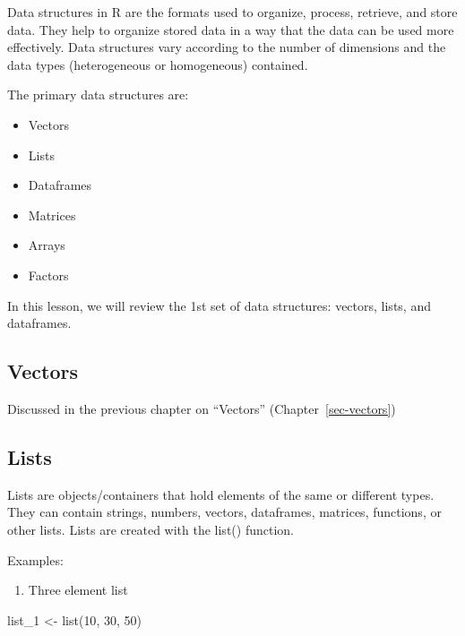 \documentclass[
  letterpaper,
  DIV=11,
  numbers=noendperiod]{scrreprt}
\newenvironment{Shaded}{}{}
\newcommand{\DecValTok}[1]{\textcolor[rgb]{0.00,0.36,0.77}{#1}}
\newcommand{\FunctionTok}[1]{\textcolor[rgb]{0.44,0.26,0.76}{#1}}
\newcommand{\NormalTok}[1]{\textcolor[rgb]{0.14,0.16,0.18}{#1}}
\newcommand{\OtherTok}[1]{\textcolor[rgb]{0.44,0.26,0.76}{#1}}
\providecommand{\tightlist}{%
  \setlength{\itemsep}{0pt}\setlength{\parskip}{0pt}}\usepackage{longtable,booktabs,array}
\begin{document}
Data structures in R are the formats used to organize, process,
retrieve, and store data. They help to organize stored data in a way
that the data can be used more effectively. Data structures vary
according to the number of dimensions and the data types (heterogeneous
or homogeneous) contained.

The primary data structures are:

\begin{itemize}
\tightlist
\item
  Vectors
\item
  Lists
\item
  Dataframes
\item
  Matrices
\item
  Arrays
\item
  Factors
\end{itemize}

In this lesson, we will review the 1st set of data structures: vectors,
lists, and dataframes.

\subsection{Vectors}\label{vectors}

Discussed in the previous chapter on ``Vectors''
(Chapter~\ref{sec-vectors})

\subsection{Lists}\label{lists}

Lists are objects/containers that hold elements of the same or different
types. They can contain strings, numbers, vectors, dataframes, matrices,
functions, or other lists. Lists are created with the list() function.

Examples:

\begin{enumerate}
\def\labelenumi{\alph{enumi}.}
\tightlist
\item
  Three element list
\end{enumerate}

\begin{Shaded}
\begin{Highlighting}[]
\NormalTok{list\_1 }\OtherTok{\textless{}{-}} \FunctionTok{list}\NormalTok{(}\DecValTok{10}\NormalTok{, }\DecValTok{30}\NormalTok{, }\DecValTok{50}\NormalTok{)}
\end{Highlighting}
\end{Shaded}
\end{document}
